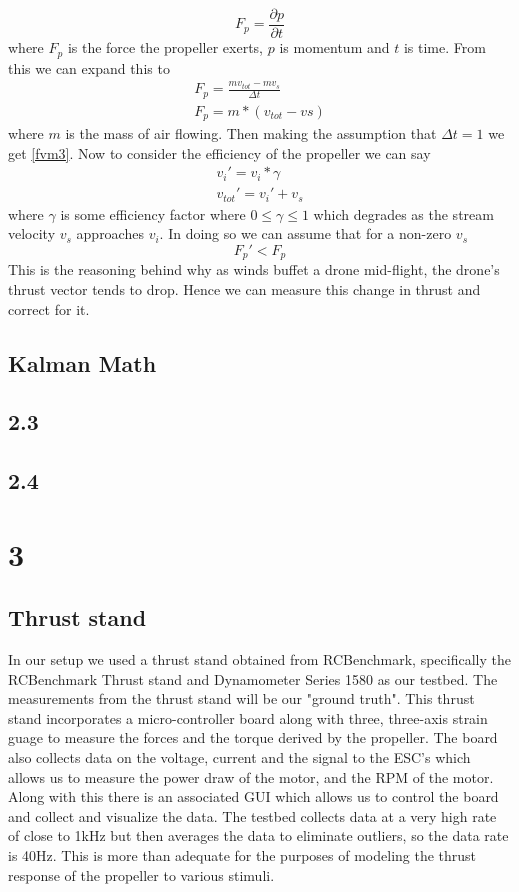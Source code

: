 \documentclass[conference]{IEEEtran}
\begin{document}
	\begin{equation}
	F_p= \frac{\partial p}{\partial t}
	\label{fvm}
	\end{equation}
	where $F_p$ is the force the propeller exerts, $p$ is momentum and $t$ is time. From this we can expand this to 
	\begin{eqnarray}
	F_p= \frac{mv_{tot} - mv_{s}}{\Delta t}\\ 
	\label{fvm2}
	F_p= m*(v_{tot}-v{s}) 
	\label{fvm3}
	\end{eqnarray}
	where $m$ is the mass of air flowing. Then making the assumption that $\Delta t = 1$ we get \ref{fvm3}.	Now to consider the efficiency of the propeller we can say 
	\begin{eqnarray}	
	v_{i}\prime = v_{i}* \gamma\\
	v_{tot}\prime = v_i\prime + v_s
	\label{eff}
	\end{eqnarray}
	where $\gamma$ is some efficiency factor where $0 \leq  \gamma \leq 1$ which degrades as the stream velocity $v_s$ approaches $v_i$\cite{someone}. In doing so we can assume that for a non-zero $v_s$ 
	\begin{equation}
	F_p\prime < F_p
	\end{equation}
	This is the reasoning behind why as winds buffet a drone mid-flight, the drone's thrust vector tends to drop. Hence we can measure this change in thrust and correct for it.
	\subsection{Kalman Math}
	\subsection{2.3}
	\subsection{2.4}
	\section{3}
	\subsection{Thrust stand}
	In our setup we used a thrust stand obtained from RCBenchmark, specifically the RCBenchmark Thrust stand and Dynamometer Series 1580 \cite{rcb} as our testbed. The measurements from the thrust stand will be our "ground truth". This thrust stand incorporates a micro-controller board along with three, three-axis strain guage to measure the forces and the torque derived by the propeller. The board also collects data on the voltage, current and the signal to the ESC's which allows us to measure the power draw of the motor, and the RPM of the motor. Along with this there is an associated GUI which allows us to control the board and collect and visualize the data. The testbed collects data at a very high rate of close to 1kHz but then averages the data to eliminate outliers, so the data rate is 40Hz. This is more than adequate for the purposes of modeling the thrust response of the propeller to various stimuli. 
\end{document}
